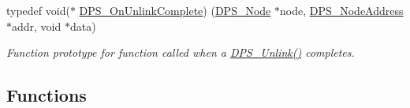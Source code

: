 \begin{DoxyCompactItemize}
typedef void($\ast$ \hyperlink{group__node_ga70b98e7cc39f0dccdba41f0984de82f6}{D\+P\+S\+\_\+\+On\+Unlink\+Complete}) (\hyperlink{group__node_ga4dd612ab965134321bb57fdb065f121c}{D\+P\+S\+\_\+\+Node} $\ast$node, \hyperlink{group__nodeaddress_ga9e9f56aa38e82b4edcef7eb81e9f5bd2}{D\+P\+S\+\_\+\+Node\+Address} $\ast$addr, void $\ast$data)
\begin{DoxyCompactList}\small\item\em Function prototype for function called when a \hyperlink{group__node_ga79c86c3c0c5d6438b953a9acaab0ab0b}{D\+P\+S\+\_\+\+Unlink()} completes. \end{DoxyCompactList}\end{DoxyCompactItemize}
\subsection*{Functions}
